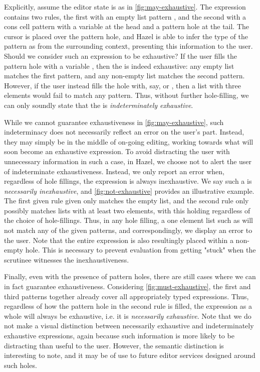 Explicitly, assume the editor state is as in \autoref{fig:may-exhaustive}. The  expression contains two rules, the first with an empty list pattern \li{[]}, and the second with a cons cell pattern \li{::} with a variable  at the head and a pattern hole at the tail. The cursor is placed over the pattern hole, and Hazel is able to infer the type of the pattern as \li{[Int]} from the surrounding context, presenting this information to the user. Should we consider such an expression to be exhaustive? If the user fills the pattern hole with a variable , then the  is indeed exhaustive: any empty list matches the first pattern, and any non-empty list matches the second pattern. However, if the user instead fills the hole with, say, \li{[]} or , then a list with three elements would fail to match any pattern. Thus, without further hole-filling, we can only soundly state that the  is \emph{indeterminately exhaustive}.

While we cannot guarantee exhaustiveness in \autoref{fig:may-exhaustive}, such indeterminacy does not necessarily reflect an error on the user's part. Instead, they may simply be in the middle of on-going editing, working towards what will soon become an exhaustive expression. To avoid distracting the user with unnecessary information in such a case, in Hazel, we choose not to alert the user of indeterminate exhaustiveness. Instead, we only report an error when, regardless of hole fillings, the expression is always inexhaustive. We say such a  is \emph{necessarily inexhaustive}, and \autoref{fig:not-exhaustive} provides an illustrative example. The first given rule given only matches the empty list, and the second rule only possibly matches lists with at least two elements, with this holding regardless of the choice of hole-fillings. Thus, in any hole filling, a one element list such as  will not match any of the given patterns, and correspondingly, we display an error to the user. Note that the entire  expression is also resultingly placed within a non-empty hole. This is necessary to prevent evaluation from getting "stuck" when the scrutinee witnesses the inexhaustiveness.

Finally, even with the presence of pattern holes, there are still cases where we can in fact guarantee exhaustiveness. Considering \autoref{fig:must-exhaustive}, the first and third patterns together already cover all appropriately typed expressions. Thus, regardless of how the pattern hole in the second rule is filled, the  expression as a whole will always be exhaustive, i.e. it is \emph{necessarily exhaustive}. Note that we do not make a visual distinction between necessarily exhaustive and indeterminately exhaustive expressions, again because such information is more likely to be distracting than useful to the user. However, the semantic distinction is interesting to note, and it may be of use to future editor services designed around such holes. 

